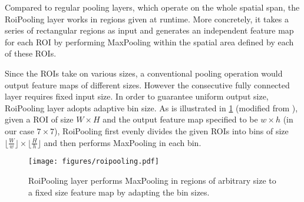 Compared to regular pooling layers, which operate on the whole spatial span, the RoiPooling layer works in regions given at runtime. 
More concretely, it takes a series of rectangular regions as input and generates an independent feature map for each ROI by performing MaxPooling within the spatial area defined by each of these ROIs. 

Since the ROIs take on various sizes, a conventional pooling operation would output feature maps of different sizes. 
However the consecutive fully connected layer requires fixed input size.
In order to guarantee uniform output size, RoiPooling layer adopts adaptive bin size.
As is illustrated in \ref{fig:roipooling} (modified from \cite{kaiminghe}), given a ROI of size $ W \times H $ and the output feature map specified to be $ w \times h $ (in our case $ 7\times 7 $), RoiPooling first evenly divides the given ROIs into bins of size $ \lfloor\frac{W}{w}\rfloor \times \lfloor \frac{H}{h}\rfloor$ and then performs MaxPooling in each bin.

\begin{figure}
\centering
\texttt{[image: figures/roipooling.pdf]}
\caption[RoiPooling]{RoiPooling layer performs MaxPooling in regions of arbitrary size to a fixed size feature map by adapting the bin sizes.}\label{fig:roipooling}
\end{figure}


